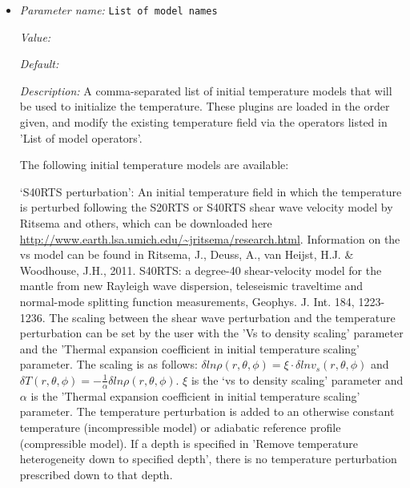 \begin{itemize}
\item {\it Parameter name:} {\tt List of model names}
\label{parameters:Initial temperature model/List of model names}


{\it Value:} 


{\it Default:} 


{\it Description:} A comma-separated list of initial temperature models that will be used to initialize the temperature. These plugins are loaded in the order given, and modify the existing temperature field via the operators listed in 'List of model operators'.

The following initial temperature models are available:

`S40RTS perturbation': An initial temperature field in which the temperature is perturbed following the S20RTS or S40RTS shear wave velocity model by Ritsema and others, which can be downloaded here \url{http://www.earth.lsa.umich.edu/~jritsema/research.html}. Information on the vs model can be found in Ritsema, J., Deuss, A., van Heijst, H.J. \& Woodhouse, J.H., 2011. S40RTS: a degree-40 shear-velocity model for the mantle from new Rayleigh wave dispersion, teleseismic traveltime and normal-mode splitting function measurements, Geophys. J. Int. 184, 1223-1236. The scaling between the shear wave perturbation and the temperature perturbation can be set by the user with the 'Vs to density scaling' parameter and the 'Thermal expansion coefficient in initial temperature scaling' parameter. The scaling is as follows: $\delta ln \rho (r,\theta,\phi) = \xi \cdot \delta ln v_s(r,\theta, \phi)$ and $\delta T(r,\theta,\phi) = - \frac{1}{\alpha} \delta ln \rho(r,\theta,\phi)$. $\xi$ is the `vs to density scaling' parameter and $\alpha$ is the 'Thermal expansion coefficient in initial temperature scaling' parameter. The temperature perturbation is added to an otherwise constant temperature (incompressible model) or adiabatic reference profile (compressible model). If a depth is specified in 'Remove temperature heterogeneity down to specified depth', there is no temperature perturbation prescribed down to that depth.


\end{itemize}
